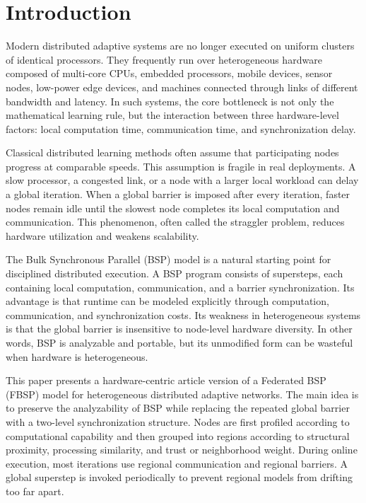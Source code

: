 ﻿\documentclass[10pt,journal]{IEEEtran}
\begin{document}
	\section{Introduction}
	
	Modern distributed adaptive systems are no longer executed on uniform clusters of identical processors. They frequently run over heterogeneous hardware composed of multi-core CPUs, embedded processors, mobile devices, sensor nodes, low-power edge devices, and machines connected through links of different bandwidth and latency. In such systems, the core bottleneck is not only the mathematical learning rule, but the interaction between three hardware-level factors: local computation time, communication time, and synchronization delay.
	
	Classical distributed learning methods often assume that participating nodes progress at comparable speeds. This assumption is fragile in real deployments. A slow processor, a congested link, or a node with a larger local workload can delay a global iteration. When a global barrier is imposed after every iteration, faster nodes remain idle until the slowest node completes its local computation and communication. This phenomenon, often called the straggler problem, reduces hardware utilization and weakens scalability.
	
	The Bulk Synchronous Parallel (BSP) model is a natural starting point for disciplined distributed execution. A BSP program consists of supersteps, each containing local computation, communication, and a barrier synchronization. Its advantage is that runtime can be modeled explicitly through computation, communication, and synchronization costs. Its weakness in heterogeneous systems is that the global barrier is insensitive to node-level hardware diversity. In other words, BSP is analyzable and portable, but its unmodified form can be wasteful when hardware is heterogeneous.
	
	This paper presents a hardware-centric article version of a Federated BSP (FBSP) model for heterogeneous distributed adaptive networks. The main idea is to preserve the analyzability of BSP while replacing the repeated global barrier with a two-level synchronization structure. Nodes are first profiled according to computational capability and then grouped into regions according to structural proximity, processing similarity, and trust or neighborhood weight. During online execution, most iterations use regional communication and regional barriers. A global superstep is invoked periodically to prevent regional models from drifting too far apart.
	
\end{document}
